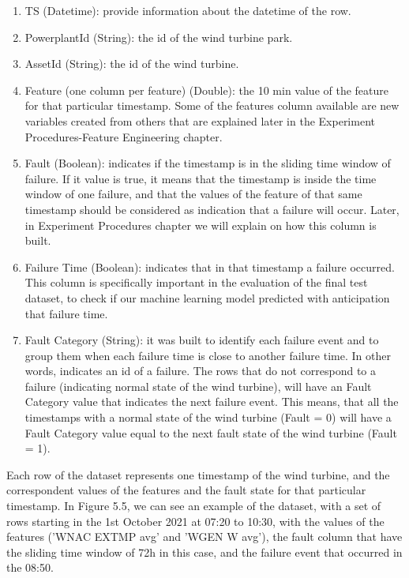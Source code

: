 \begin{enumerate}
    \item
TS (Datetime): provide information about the datetime of the row.
    \item
PowerplantId (String): the id of the wind turbine park.
    \item
AssetId (String): the id of the wind turbine.
    \item
Feature (one column per feature) (Double): the 10 min value of the feature for that particular timestamp. Some of the features column available are new variables created from others that are explained later in the Experiment Procedures-Feature Engineering chapter.
    \item
Fault (Boolean): indicates if the timestamp is in the sliding time window of failure. If it value is true, it means that the timestamp is inside the time window of one failure, and that the values of the feature of that same timestamp should be considered as indication that a failure will occur. Later, in Experiment Procedures chapter we will explain on how this column is built.
    \item
Failure Time (Boolean): indicates that in that timestamp a failure occurred. This column is specifically important in the evaluation of the final test dataset, to check if our machine learning model predicted with anticipation that failure time.
    \item
Fault Category (String): it was built to identify each failure event and to group them when each failure time is close to another failure time. In other words, indicates an id of a failure. The rows that do not correspond to a failure (indicating normal state of the wind turbine), will have an Fault Category value that indicates the next failure event. This means, that all the timestamps with a normal state of the wind turbine (Fault = 0) will have a Fault Category value equal to the next fault state of the wind turbine (Fault = 1).

\end{enumerate}

Each row of the dataset represents one timestamp of the wind turbine, and the correspondent values of the features and the fault state for that particular timestamp. In Figure 5.5, we can see an example of the dataset, with a set of rows starting in the 1st October 2021 at 07:20 to 10:30, with the values of the features ('WNAC EXTMP avg' and 'WGEN W avg'), the fault column that have the sliding time window of 72h in this case, and the failure event that occurred in the 08:50.

